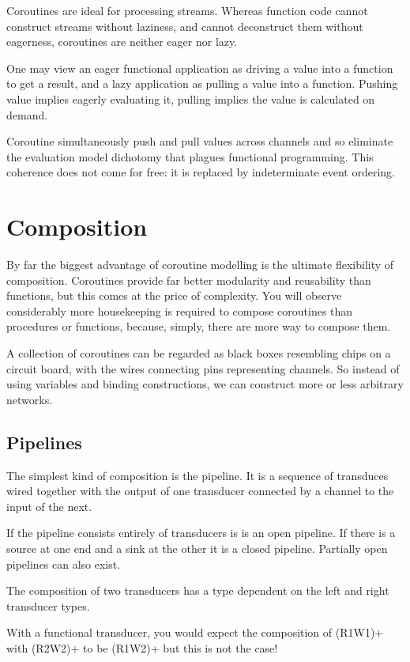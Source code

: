 \documentclass{article}
\begin{document}
Coroutines are ideal for processing streams. Whereas
function code cannot construct streams without laziness,
and cannot deconstruct them without eagerness, coroutines
are neither eager nor lazy.

One may view an eager functional application as driving a
value into a function to get a result, and a lazy application
as pulling a value into a function. Pushing value implies
eagerly evaluating it, pulling implies the value is calculated
on demand.

Coroutine simultaneously push and pull values across channels
and so eliminate the evaluation model dichotomy that plagues
functional programming. This coherence does not come for
free: it is replaced by indeterminate event ordering.

\section{Composition}
By far the biggest advantage of coroutine modelling is the 
ultimate flexibility of composition. Coroutines provide
far better modularity and reusability than functions,
but this comes at the price of complexity. You will observe
considerably more housekeeping is required to compose
coroutines than procedures or functions, because, simply,
there are more way to compose them.

A collection of coroutines can be regarded as black boxes
resembling chips on a circuit board, with the wires
connecting pins representing channels. So instead of using
variables and binding constructions, we can construct more
or less arbitrary networks.

\subsection{Pipelines}
The simplest kind of composition is the pipeline. It is a sequence
of transduces wired together with the output of one transducer
connected by a channel to the input of the next.

If the pipeline consists entirely of transducers is is an open
pipeline. If there is a source at one end and a sink at the other
it is a closed pipeline. Partially open pipelines can also exist.

The composition of two transducers has a type dependent on
the left and right transducer types. 

With a functional transducer, you would expect the composition
of (R1W1)+ with (R2W2)+ to be (R1W2)+ but this is not the case!
\end{document}

